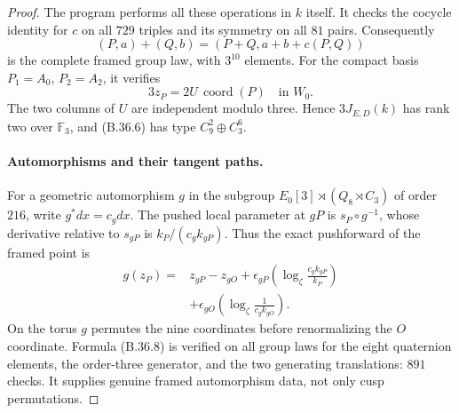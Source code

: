 \begin{proof}
The program  performs
all these operations in $k$ itself.
It checks the cocycle identity for $c$ on all $729$
triples and its symmetry on all $81$ pairs.
Consequently
\[
 (P,a)+(Q,b)=(P+Q,a+b+c(P,Q))                                \tag{B.36.6}
\]
is the complete framed group law, with $3^{10}$ elements.
For the compact basis $P_1=A_0$, $P_2=A_2$, it verifies
\[
                    3z_P=2U\,\operatorname{coord}(P)
                         \quad\text{in }W_0.                \tag{B.36.7}
\]
The two columns of $U$ are independent modulo three.
Hence $3J_{E,D}(k)$ has rank two over $\mathbb F_3$,
and (B.36.6) has type $C_9^2\oplus C_3^6$.

\paragraph{Automorphisms and their tangent paths.}
For a geometric automorphism $g$ in the subgroup
$E_0[3]\rtimes(Q_8\rtimes C_3)$ of order $216$, write
$g^*dx=c_gdx$.  The pushed local parameter at $gP$
is $s_P\circ g^{-1}$, whose derivative relative to
$s_{gP}$ is $k_P/(c_gk_{gP})$.
Thus the exact pushforward of the framed point is
\[
 \begin{split}
 g(z_P)={}&z_{gP}-z_{gO}
       +\epsilon_{gP}\left(\log_\zeta
                              \frac{c_gk_{gP}}{k_P}\right)\\
       &+\epsilon_{gO}\left(\log_\zeta
                              \frac1{c_gk_{gO}}\right).
 \end{split}                                                   \tag{B.36.8}
\]
On the torus $g$ permutes the nine coordinates before
renormalizing the $O$ coordinate.
Formula (B.36.8) is verified on all group laws for the
eight quaternion elements, the order-three generator,
and the two generating translations: $891$ checks.
It supplies genuine framed automorphism data, not
only cusp permutations.


\end{proof}
